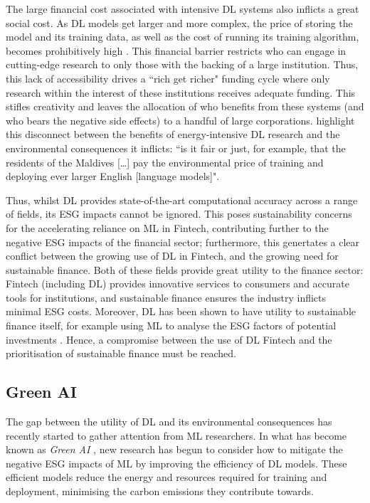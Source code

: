 \documentclass[a4paper, 11pt]{report}
\begin{document}
   The large financial cost associated with intensive DL systems also inflicts a great social cost. As DL models get larger and more complex, the price of storing the model and its training data, as well as the cost of running its training algorithm, becomes prohibitively high \citep{schwartz-2019}. This financial barrier restricts who can engage in cutting-edge research to only those with the backing of a large institution. Thus, this lack of accessibility drives a ``rich get richer" funding cycle \citep{strubell-2019} where only research within the interest of these institutions receives adequate funding. This stifles creativity and leaves the allocation of who benefits from these systems (and who bears the negative side effects) to a handful of large corporations. \citet{bender-2021} highlight this disconnect between the benefits of energy-intensive DL research and the environmental consequences it inflicts: ``is it fair or just, for example, that the residents of the Maldives [\ldots] pay the environmental price of training and deploying ever larger English [language models]".

    Thus, whilst DL provides state-of-the-art computational accuracy across a range of fields, its ESG impacts cannot be ignored. This poses sustainability concerns for the accelerating reliance on ML in Fintech, contributing further to the negative ESG impacts of the financial sector; furthermore, this genertates a clear conflict between the growing use of DL in Fintech, and the growing need for sustainable finance. Both of these fields provide great utility to the finance sector: Fintech (including DL) provides innovative services to consumers and accurate tools for institutions, and sustainable finance ensures the industry inflicts minimal ESG costs. Moreover, DL has been shown to have utility to sustainable finance itself, for example using ML to analyse the ESG factors of potential investments \citep{mehra-2022}. Hence, a compromise between the use of DL Fintech and the prioritisation of sustainable finance must be reached. 


    \subsection{Green AI}

    The gap between the utility of DL and its environmental consequences has recently started to gather attention from ML researchers. In what has become known as \emph{Green AI} \citep{schwartz-2019}, new research has begun to consider how to mitigate the negative ESG impacts of ML by improving the efficiency of DL models. These efficient models reduce the energy and resources required for training and deployment, minimising the carbon emissions they contribute towards. 
\end{document}
